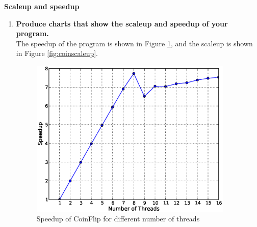 \documentclass[letterpaper, 11pt]{article}
\begin{document}
\textbf{Scaleup and speedup}\\
\begin{enumerate}
    \item \textbf{Produce charts that show the scaleup and speedup of your program.}\\
        The speedup of the program is shown in Figure \ref{fig:coinspeedup}, and the scaleup is shown in Figure \ref{fig:coinscaleup}.

        \begin{figure}[h]
            \centering
            \includegraphics[width=3.8in]{coinspeedup.eps}
            \caption{Speedup of CoinFlip for different number of threads}
            \label{fig:coinspeedup}
        \end{figure}


\end{enumerate}
\end{document}
